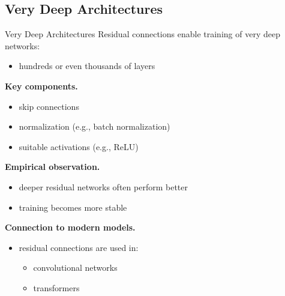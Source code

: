 \documentclass[aspectratio=169,11pt]{beamer}
\begin{document}
\subsection{Very Deep Architectures}
\begin{frame}[t,allowframebreaks]{Very Deep Architectures}
\small
Residual connections enable training of very deep networks:

\begin{itemize}
    \item hundreds or even thousands of layers
\end{itemize}

\textbf{Key components.}\\ \begin{itemize}
    \item skip connections
    \item normalization (e.g., batch normalization)
    \item suitable activations (e.g., ReLU)
\end{itemize}

\textbf{Empirical observation.}\\ \begin{itemize}
    \item deeper residual networks often perform better
    \item training becomes more stable
\end{itemize}

\textbf{Connection to modern models.}\\ \begin{itemize}
    \item residual connections are used in:
    \begin{itemize}
        \item convolutional networks
        \item transformers
    \end{itemize}
\end{itemize}
\end{frame}
\end{document}

